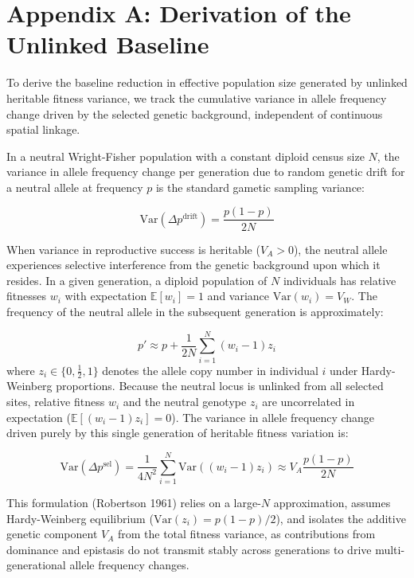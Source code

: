 \documentclass[12pt]{article}
\begin{document}
\appendix
\section{Appendix A: Derivation of the Unlinked Baseline}
To derive the baseline reduction in effective population size generated by unlinked heritable fitness variance, we track the cumulative variance in allele frequency change driven by the selected genetic background, independent of continuous spatial linkage.

In a neutral Wright-Fisher population with a constant diploid census size $N$, the variance in allele frequency change per generation due to random genetic drift for a neutral allele at frequency $p$ is the standard gametic sampling variance:

\begin{equation}
    \text{Var}(\Delta p^{\text{drift}}) = \frac{p(1-p)}{2N}
\end{equation}

When variance in reproductive success is heritable ($V_A > 0$), the neutral allele experiences selective interference from the genetic background upon which it resides. In a given generation, a diploid population of $N$ individuals has relative fitnesses $w_i$ with expectation $\mathbb{E}[w_i] = 1$ and variance $\text{Var}(w_i) = V_W$. The frequency of the neutral allele in the subsequent generation is approximately:

\begin{equation}
    p' \approx p + \frac{1}{2N}\sum_{i=1}^{N}(w_i - 1)z_i
\end{equation}
where $z_i \in \{0, \frac{1}{2}, 1\}$ denotes the allele copy number in individual $i$ under Hardy-Weinberg proportions. Because the neutral locus is unlinked from all selected sites, relative fitness $w_i$ and the neutral genotype $z_i$ are uncorrelated in expectation ($\mathbb{E}[(w_i-1)z_i] = 0$). The variance in allele frequency change driven purely by this single generation of heritable fitness variation is:

\begin{equation}
    \text{Var}(\Delta p^{\text{sel}}) =\frac{1}{4N^2}\sum_{i=1}^{N}\text{Var}((w_i - 1)z_i) \approx V_A \frac{p(1-p)}{2N}
\end{equation}

This formulation (Robertson 1961) relies on a large-$N$ approximation, assumes Hardy-Weinberg equilibrium ($\text{Var}(z_i) = p(1-p)/2$), and isolates the additive genetic component $V_A$ from the total fitness variance, as contributions from dominance and epistasis do not transmit stably across generations to drive multi-generational allele frequency changes.
\end{document}
